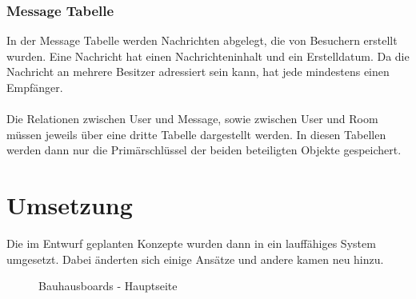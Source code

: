 \subsubsection{Message Tabelle}\label{Message Tabelle}
In der Message Tabelle werden Nachrichten abgelegt, die von Besuchern erstellt wurden. Eine Nachricht hat einen Nachrichteninhalt und ein Erstelldatum. Da die Nachricht an mehrere Besitzer adressiert sein kann, hat jede mindestens einen Empfänger.
\\
\\
Die Relationen zwischen User und Message, sowie zwischen User und Room müssen jeweils über eine dritte Tabelle dargestellt werden. In diesen Tabellen werden dann nur die Primärschlüssel der beiden beteiligten Objekte gespeichert.






















\section{Umsetzung}\label{Umsetzung}
Die im Entwurf geplanten Konzepte wurden dann in ein lauffähiges System umgesetzt. Dabei änderten sich einige Ansätze und andere kamen neu hinzu.
\begin{figure}[h!]
  \centering
  \caption{Bauhausboards - Hauptseite}
  \label{img:finalHauptseite}
\end{figure}

